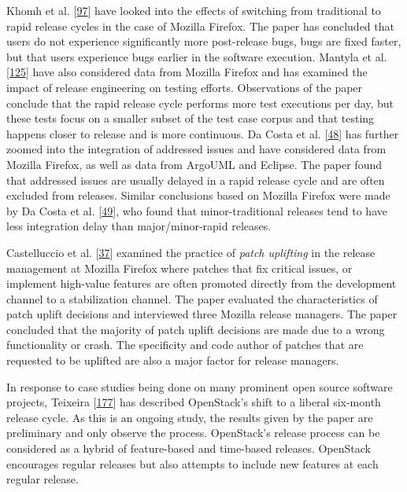 \documentclass[]{book}
\begin{document}
Khomh et al. {[}\protect\hyperlink{ref-khomh2015a}{97}{]} have looked
into the effects of switching from traditional to rapid release cycles
in the case of Mozilla Firefox. The paper has concluded that users do
not experience significantly more post-release bugs, bugs are fixed
faster, but that users experience bugs earlier in the software
execution. Mantyla et al.
{[}\protect\hyperlink{ref-mantyla2015a}{125}{]} have also considered
data from Mozilla Firefox and has examined the impact of release
engineering on testing efforts. Observations of the paper conclude that
the rapid release cycle performs more test executions per day, but these
tests focus on a smaller subset of the test case corpus and that testing
happens closer to release and is more continuous. Da Costa et al.
{[}\protect\hyperlink{ref-da2014a}{48}{]} has further zoomed into the
integration of addressed issues and have considered data from Mozilla
Firefox, as well as data from ArgoUML and Eclipse. The paper found that
addressed issues are usually delayed in a rapid release cycle and are
often excluded from releases. Similar conclusions based on Mozilla
Firefox were made by Da Costa et al.
{[}\protect\hyperlink{ref-da2016a}{49}{]}, who found that
minor-traditional releases tend to have less integration delay than
major/minor-rapid releases.

Castelluccio et al. {[}\protect\hyperlink{ref-castelluccio2017a}{37}{]}
examined the practice of \emph{patch uplifting} in the release
management at Mozilla Firefox where patches that fix critical issues, or
implement high-value features are often promoted directly from the
development channel to a stabilization channel. The paper evaluated the
characteristics of patch uplift decisions and interviewed three Mozilla
release managers. The paper concluded that the majority of patch uplift
decisions are made due to a wrong functionality or crash. The
specificity and code author of patches that are requested to be uplifted
are also a major factor for release managers.

In response to case studies being done on many prominent open source
software projects, Teixeira
{[}\protect\hyperlink{ref-teixeira2017a}{177}{]} has described
OpenStack's shift to a liberal six-month release cycle. As this is an
ongoing study, the results given by the paper are preliminary and only
observe the process. OpenStack's release process can be considered as a
hybrid of feature-based and time-based releases. OpenStack encourages
regular releases but also attempts to include new features at each
regular release.
\end{document}
